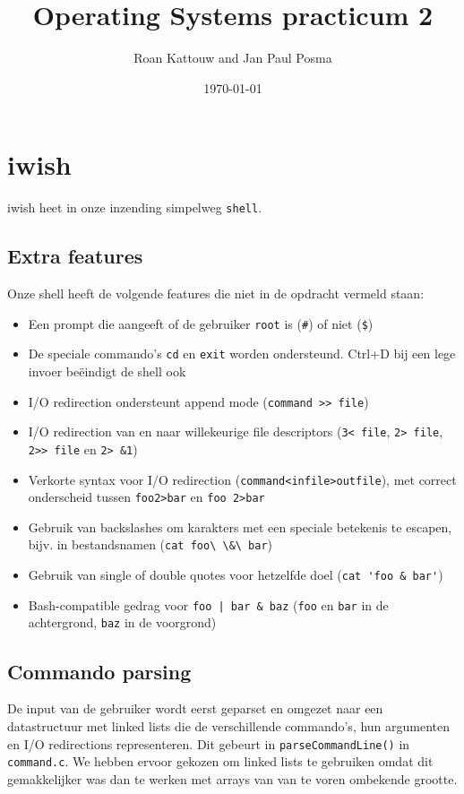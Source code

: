 \documentclass[11pt]{article}
\begin{document}
\author{Roan Kattouw and Jan Paul Posma}
\date{\today}
\title{Operating Systems practicum 2}

\maketitle

\section*{iwish}
iwish heet in onze inzending simpelweg \verb+shell+.

\subsection*{Extra features}
Onze shell heeft de volgende features die niet in de opdracht vermeld staan:
\begin{itemize}
\item Een prompt die aangeeft of de gebruiker \verb+root+ is (\verb+#+) of niet (\verb+$+)
\item De speciale commando's \verb+cd+ en \verb+exit+ worden ondersteund. Ctrl+D bij een lege invoer be\"eindigt de shell ook
\item I/O redirection ondersteunt append mode (\verb+command >> file+)
\item I/O redirection van en naar willekeurige file descriptors (\verb+3< file+, \verb+2> file+, \verb+2>> file+ en \verb+2> &1+)
\item Verkorte syntax voor I/O redirection (\verb+command<infile>outfile+), met correct onderscheid tussen \verb+foo2>bar+ en \verb+foo 2>bar+
\item Gebruik van backslashes om karakters met een speciale betekenis te escapen, bijv. in bestandsnamen (\verb+cat foo\ \&\ bar+)
\item Gebruik van single of double quotes voor hetzelfde doel (\verb+cat 'foo & bar'+)
\item Bash-compatible gedrag voor \verb+foo | bar & baz+ (\verb+foo+ en \verb+bar+ in de achtergrond, \verb+baz+ in de voorgrond)
\end{itemize}

\subsection*{Commando parsing}
De input van de gebruiker wordt eerst geparset en omgezet naar een datastructuur met linked lists die
de verschillende commando's, hun argumenten en I/O redirections representeren. Dit gebeurt in \verb+parseCommandLine()+
in \verb+command.c+. We hebben ervoor gekozen om linked lists te gebruiken omdat dit gemakkelijker was dan te werken
met arrays van van te voren ombekende grootte.
\end{document}
